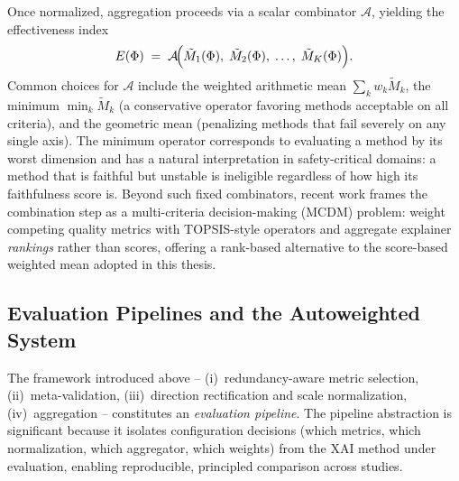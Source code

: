 Once normalized, aggregation proceeds via a scalar combinator $\mathcal{A}$,
yielding the effectiveness index
$$
E(\Phi) \;=\; \mathcal{A}\!\Bigl(
    \tilde{M}_1(\Phi),\; \tilde{M}_2(\Phi),\; \dots,\; \tilde{M}_K(\Phi)
\Bigr).
$$
Common choices for $\mathcal{A}$ include the weighted arithmetic mean
$\sum_k w_k \tilde{M}_k$, the minimum $\min_k \tilde{M}_k$ (a conservative
operator favoring methods acceptable on all criteria), and the geometric mean
(penalizing methods that fail severely on any single axis). The minimum
operator corresponds to evaluating a method by its worst dimension and has a
natural interpretation in safety-critical domains: a method that is faithful
but unstable is ineligible regardless of how high its faithfulness score is.
Beyond such fixed combinators, recent work frames the combination step as a
multi-criteria decision-making (MCDM) problem: \citet{chatterjee2025mcdm}
weight competing quality metrics with TOPSIS-style operators and aggregate
explainer \emph{rankings} rather than scores, offering a rank-based
alternative to the score-based weighted mean adopted in this thesis.

\subsection{Evaluation Pipelines and the Autoweighted System}
\label{subsec:evaluation-pipelines}

The framework introduced above -- (i)~redundancy-aware metric selection,
(ii)~meta-validation, (iii)~direction rectification and scale normalization,
(iv)~aggregation -- constitutes an \emph{evaluation pipeline}. The pipeline
abstraction is significant because it isolates configuration decisions (which
metrics, which normalization, which aggregator, which weights) from the XAI
method under evaluation, enabling reproducible, principled comparison across
studies.


